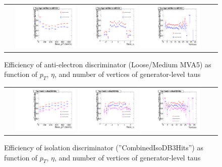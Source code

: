 \begin{figure}[tbh!]
    \centering
    \begin{tabular}{cc}
      \includegraphics[width=0.30\textwidth]{AgainstElectron_4_29_16.pdf}
      \includegraphics[width=0.30\textwidth]{AgainstElectron_eta_4_29_16.pdf}
       \includegraphics[width=0.30\textwidth]{AgainstElectron_nvtx_4_29_16.pdf}
    \end{tabular}
    \caption{Efficiency of anti-electron discriminator (Loose/Medium MVA5) as function of $p_{T}$, $\eta$, and number of vertices of generator-level taus }
    \label{fig:EM5}
  \end{figure}

\begin{figure}[tbh!]
    \centering
    \begin{tabular}{cc}
      \includegraphics[width=0.30\textwidth]{CombinedIso_4_29_16.pdf}
      \includegraphics[width=0.30\textwidth]{CombinedIso_eta_4_29_16.pdf}
       \includegraphics[width=0.30\textwidth]{CombinedIso_nvtx_4_29_16.pdf}
    \end{tabular}
    \caption{Efficiency of isolation discriminator (''CombinedIsoDB3Hits'') as function of $p_{T}$, $\eta$, and number of vertices of generator-level taus }
    \label{fig:TIso}
  \end{figure}



